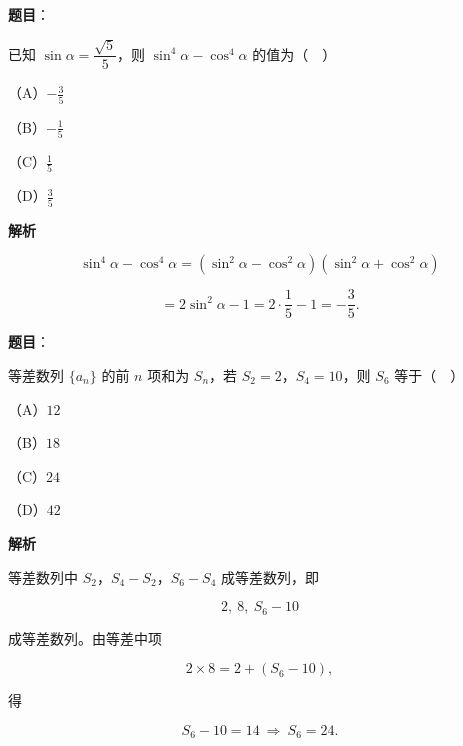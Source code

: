 \begin{answer}

\textbf{题目}：

已知 $\sin\alpha=\dfrac{\sqrt5}{5}$，则 $\sin^4\alpha-\cos^4\alpha$ 的值为（　）

（A）$-\frac35$

（B）$-\frac15$

（C）$\frac15$

（D）$\frac35$

\textbf{解析}

\nopagebreak[4]
\[\sin^4\alpha-\cos^4\alpha=(\sin^2\alpha-\cos^2\alpha)(\sin^2\alpha+\cos^2\alpha)\]

\nopagebreak[4]
\[=2\sin^2\alpha-1=2\cdot\frac15-1=-\frac35.\]


\end{answer}
\begin{answer}

\textbf{题目}：

等差数列 $\{a_n\}$ 的前 $n$ 项和为 $S_n$，若 $S_2=2$，$S_4=10$，则 $S_6$ 等于（　）

（A）$12$

（B）$18$

（C）$24$

（D）$42$

\textbf{解析}

等差数列中 $S_2$，$S_4-S_2$，$S_6-S_4$ 成等差数列，即

\nopagebreak[4]
\[2,\ 8,\ S_6-10\]

成等差数列。由等差中项

\nopagebreak[4]
\[2\times8=2+(S_6-10),\]

得

\nopagebreak[4]
\[S_6-10=14\ \Rightarrow\ S_6=24.\]


\end{answer}

